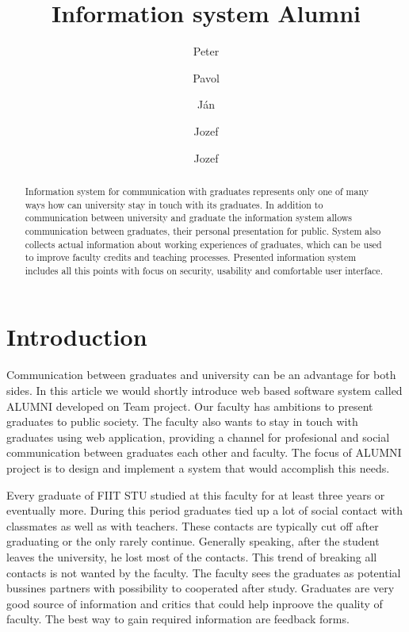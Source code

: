 \documentclass{iitsrc}[2006/14/02]
\title{Information system Alumni}
\author{Peter}{C\'ich}
\author{Pavol}{F\'abik}
\author{J\'an}{Garaj}
\author{Jozef}{Hergott}
\author{Jozef}{Hopko}
\begin{document}
\begin{abstract}
Information system for communication with graduates represents only one of many ways how can university stay in touch with its graduates. In addition to communication between university and graduate the information system allows communication between graduates, their personal presentation for public. System also collects actual information about working experiences of graduates, which can be used to improve faculty credits and teaching processes. Presented information system includes all this points with focus on security, usability and comfortable user interface.
\end{abstract}


\section{Introduction}

Communication between graduates and university can be an advantage for both sides. In this article we would shortly introduce web based software system called ALUMNI developed on Team project. Our faculty has ambitions to present graduates to public society. The faculty also wants to stay in touch with graduates using web application, providing a channel for profesional and social communication between graduates each other and faculty. The focus of ALUMNI project is to design and implement a system that would accomplish this needs. 

Every graduate of FIIT STU studied at this faculty for at least three years or eventually more. During this period graduates tied up a lot of social contact with classmates as well as with teachers. These contacts are typically cut off after graduating or the only rarely continue. Generally speaking, after the student leaves the university, he lost most of the contacts. This trend of breaking all contacts is not wanted by the faculty. The faculty sees the graduates as potential bussines partners with possibility to cooperated after study. Graduates are very good source of information and critics that could help inproove the quality of faculty. The best way to gain required information are feedback forms.

\end{document}

